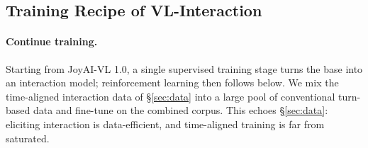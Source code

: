 



\subsection{Training Recipe of VL-Interaction}
\label{sec:recipe}

\paragraph{\textbf{Continue training.}}
Starting from JoyAI-VL 1.0, a single supervised training stage turns the base into an interaction model; reinforcement learning then follows below. We mix the time-aligned interaction data of \S\ref{sec:data} into a large pool of conventional turn-based data and fine-tune on the combined corpus. 
This echoes \S\ref{sec:data}: eliciting interaction is data-efficient, and time-aligned training is far from saturated.

